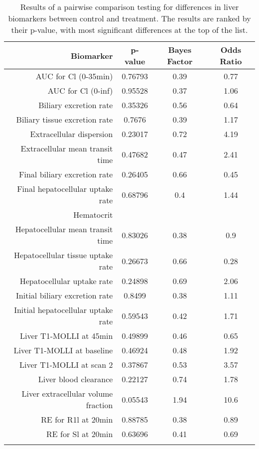 \documentclass{epflreport}%
\begin{document}
%
\begin{longtable}{rccc}%
\hline%
Biomarker&p{-}value&Bayes Factor&Odds Ratio\\%
\hline%
AUC for Cl (0{-}35min)&0.76793&0.39&0.77\\%
AUC for Cl (0{-}inf)&0.95528&0.37&1.06\\%
Biliary excretion rate&0.35326&0.56&0.64\\%
Biliary tissue excretion rate&0.7676&0.39&1.17\\%
Extracellular dispersion&0.23017&0.72&4.19\\%
Extracellular mean transit time&0.47682&0.47&2.41\\%
Final biliary excretion rate&0.26405&0.66&0.45\\%
Final hepatocellular uptake rate&0.68796&0.4&1.44\\%
Hematocrit&&&\\%
Hepatocellular mean transit time&0.83026&0.38&0.9\\%
Hepatocellular tissue uptake rate&0.26673&0.66&0.28\\%
Hepatocellular uptake rate&0.24898&0.69&2.06\\%
Initial biliary excretion rate&0.8499&0.38&1.11\\%
Initial hepatocellular uptake rate&0.59543&0.42&1.71\\%
Liver T1{-}MOLLI at 45min&0.49899&0.46&0.65\\%
Liver T1{-}MOLLI at baseline&0.46924&0.48&1.92\\%
Liver T1{-}MOLLI at scan 2&0.37867&0.53&3.57\\%
Liver blood clearance&0.22127&0.74&1.78\\%
Liver extracellular volume fraction&0.05543&1.94&10.6\\%
RE for R1l at 20min&0.88785&0.38&0.89\\%
RE for Sl at 20min&0.63696&0.41&0.69\\%
\hline%
\caption{Results of a pairwise comparison testing for differences in liver biomarkers between control and treatment. The results are ranked by their p-value, with most significant differences at the top of the list.} \\%
\end{longtable}%
\end{document}
